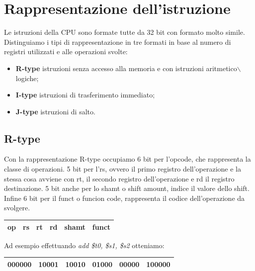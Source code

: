 \section{Rappresentazione dell'istruzione}
Le istruzioni della CPU sono formate tutte da 32 bit con formato molto simile. Distinguiamo i tipi di rappresentazione in tre formati in base al numero di registri utilizzati e alle operazioni svolte:
\begin{itemize}
    \item \textbf{R-type} istruzioni senza accesso alla memoria e con istruzioni aritmetico$\backslash$logiche;
    \item \textbf{I-type} istruzioni di trasferimento immediato;
    \item \textbf{J-type} istruzioni di salto.
\end{itemize}


\subsection*{R-type}
Con la rappresentazione R-type occupiamo 6 bit per l'opcode, che rappresenta la classe di operazioni. 5 bit per l'rs, ovvero il primo registro dell'operazione e la stessa cosa avviene con rt, il secondo registro dell'operazione e rd il registro destinazione. 5 bit anche per lo shamt o shift amount, indice il valore dello shift. Infine 6 bit per il funct o funcion code, rappresenta il codice dell'operazione da svolgere.

\begin{table}[H]
    \centering
    \begin{tabular}{|p{1.5cm}|p{1.5cm}|p{1.5cm}|p{1.5cm}|p{1.5cm}|p{1.5cm}|}
         \hline \large{op} & \large{rs} & \large{rt} & \large{rd} & \large{shamt} & \large{funct}\\\hline
    \end{tabular}
\end{table}

Ad esempio effettuando \textit{add \$t0, \$s1, \$s2} otteniamo:

\begin{table}[H]
    \centering
    \begin{tabular}{|p{1.5cm}|p{1.5cm}|p{1.5cm}|p{1.5cm}|p{1.5cm}|p{1.5cm}|}
         \hline \large{000000} & \large{10001} & \large{10010} & \large{01000} & \large{00000} & \large{100000}\\\hline
    \end{tabular}
\end{table}

